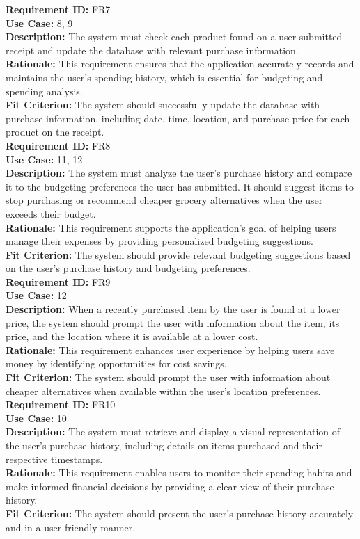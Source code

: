 \documentclass[12pt]{article}
\begin{document}
\medskip
\noindent \textbf{Requirement ID:} FR7\\
\textbf{Use Case:} 8, 9\\
\textbf{Description:} The system must check each product found on a user-submitted receipt and update the database with relevant purchase information.\\
\textbf{Rationale:} This requirement ensures that the application accurately records and maintains the user's spending history, which is essential for budgeting and spending analysis.\\
\textbf{Fit Criterion:} The system should successfully update the database with purchase information, including date, time, location, and purchase price for each product on the receipt.\\

\medskip
\noindent \textbf{Requirement ID:} FR8\\
\textbf{Use Case:} 11, 12\\
\textbf{Description:} The system must analyze the user's purchase history and compare it to the budgeting preferences the user has submitted. It should suggest items to stop purchasing or recommend cheaper grocery alternatives when the user exceeds their budget.\\
\textbf{Rationale:} This requirement supports the application's goal of helping users manage their expenses by providing personalized budgeting suggestions.\\
\textbf{Fit Criterion:} The system should provide relevant budgeting suggestions based on the user's purchase history and budgeting preferences.\\

\medskip
\noindent \textbf{Requirement ID:} FR9\\
\textbf{Use Case:} 12\\
\textbf{Description:} When a recently purchased item by the user is found at a lower price, the system should prompt the user with information about the item, its price, and the location where it is available at a lower cost.\\
\textbf{Rationale:} This requirement enhances user experience by helping users save money by identifying opportunities for cost savings.\\
\textbf{Fit Criterion:} The system should prompt the user with information about cheaper alternatives when available within the user's location preferences.\\

\medskip
\noindent \textbf{Requirement ID:} FR10\\
\textbf{Use Case:} 10\\
\textbf{Description:} The system must retrieve and display a visual representation of the user's purchase history, including details on items purchased and their respective timestamps.\\
\textbf{Rationale:} This requirement enables users to monitor their spending habits and make informed financial decisions by providing a clear view of their purchase history.\\
\textbf{Fit Criterion:} The system should present the user's purchase history accurately and in a user-friendly manner.\\
\end{document}
